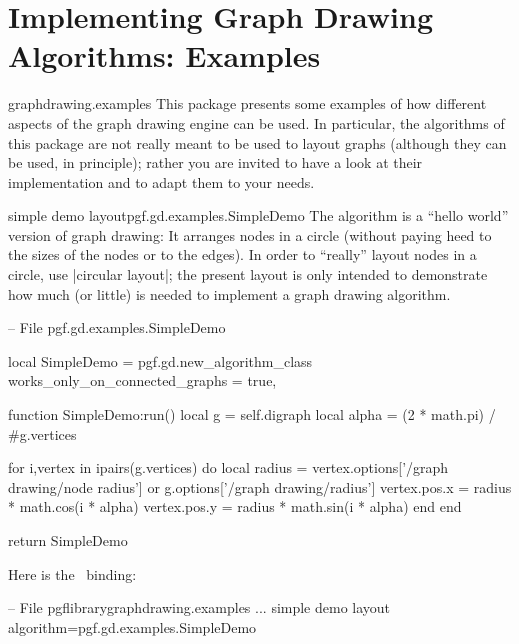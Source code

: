 %
%
%

\section{Implementing Graph Drawing Algorithms: Examples}


\begin{tikzlibrary}{graphdrawing.examples}
  This package presents some examples of how different aspects of the
  graph drawing engine can be used. In particular, the algorithms of
  this package are not really meant to be used to layout graphs
  (although they can be used, in principle); rather you are invited to
  have a look at their implementation and to adapt them to your
  needs. 
\end{tikzlibrary}


\begin{gdalgorithm}{simple demo layout}{pgf.gd.examples.SimpleDemo}
  The algorithm is a ``hello world'' version of graph drawing: It
  arranges nodes in a circle (without paying heed to the sizes of the
  nodes or to the edges). In order to ``really'' layout nodes in a
  circle, use |circular layout|; the present layout is only intended
  to demonstrate how much (or little) is needed to implement a graph
  drawing algorithm.
\begin{codeexample}
-- File pgf.gd.examples.SimpleDemo

local SimpleDemo = pgf.gd.new_algorithm_class {
  works_only_on_connected_graphs = true,
}

function SimpleDemo:run()
  local g = self.digraph
  local alpha = (2 * math.pi) / #g.vertices

  for i,vertex in ipairs(g.vertices) do
    local radius = vertex.options['/graph drawing/node radius'] or g.options['/graph drawing/radius']
    vertex.pos.x = radius * math.cos(i * alpha)
    vertex.pos.y = radius * math.sin(i * alpha)
  end
end

return SimpleDemo
\end{codeexample}
Here is the \tikzname\ binding:
\begin{codeexample}
-- File pgflibrarygraphdrawing.examples
...  
                         {simple demo layout}
                         {algorithm=pgf.gd.examples.SimpleDemo}
\end{codeexample}

\end{gdalgorithm}


